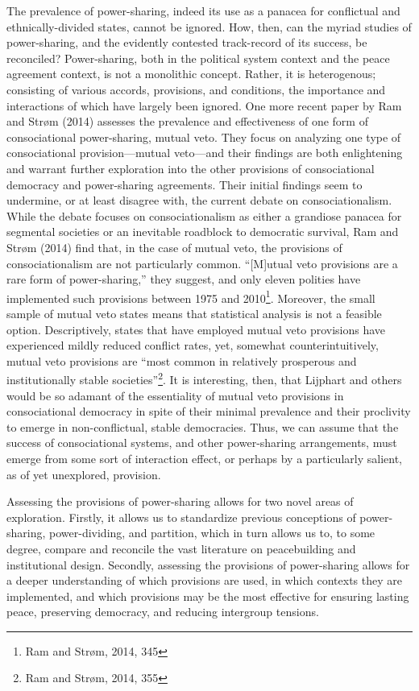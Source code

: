 \documentclass[12pt]{article}
\begin{document}
The prevalence of power-sharing, indeed its use as a panacea for conflictual and ethnically-divided states, cannot be ignored. How, then, can the myriad studies of power-sharing, and the evidently contested track-record of its success, be reconciled? Power-sharing, both in the political system context and the peace agreement context, is not a monolithic concept. Rather, it is heterogenous; consisting of various accords, provisions, and conditions, the importance and interactions of which have largely been ignored. One more recent paper by Ram and Strøm (2014) assesses the prevalence and effectiveness of one form of consociational power-sharing, mutual veto. They focus on analyzing one type of consociational provision—mutual veto—and their findings are both enlightening and warrant further exploration into the other provisions of consociational democracy and power-sharing agreements. Their initial findings seem to undermine, or at least disagree with, the current debate on consociationalism. While the debate focuses on consociationalism as either a grandiose panacea for segmental societies or an inevitable roadblock to democratic survival, Ram and Strøm (2014) find that, in the case of mutual veto, the provisions of consociationalism are not particularly common. “[M]utual veto provisions are a rare form of power-sharing,” they suggest, and only eleven polities have implemented such provisions between 1975 and 2010\footnote{Ram and Strøm, 2014, 345}. Moreover, the small sample of mutual veto states means that statistical analysis is not a feasible option. Descriptively, states that have employed mutual veto provisions have experienced mildly reduced conflict rates, yet, somewhat counterintuitively, mutual veto provisions are “most common in relatively prosperous and institutionally stable societies”\footnote{Ram and Strøm, 2014, 355}. It is interesting, then, that Lijphart and others would be so adamant of the essentiality of mutual veto provisions in consociational democracy in spite of their minimal prevalence and their proclivity to emerge in non-conflictual, stable democracies. Thus, we can assume that the success of consociational systems, and other power-sharing arrangements, must emerge from some sort of interaction effect, or perhaps by a particularly salient, as of yet unexplored, provision.

Assessing the provisions of power-sharing allows for two novel areas of exploration.  Firstly, it allows us to standardize previous conceptions of power-sharing, power-dividing, and partition, which in turn allows us to, to some degree, compare and reconcile the vast literature on peacebuilding and institutional design. Secondly, assessing the provisions of power-sharing allows for a deeper understanding of which provisions are used, in which contexts they are implemented, and which provisions may be the most effective for ensuring lasting peace, preserving democracy, and reducing intergroup tensions. 
\end{document}
